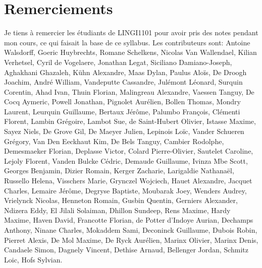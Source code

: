 \section*{Remerciements}

Je tiens à remercier les étudiants de LINGI1101 pour avoir pris des
notes pendant mon cours, ce qui faisait la base de ce syllabus.  Les
contributeurs sont:
Antoine Walsdorff,
Goeric Huybrechts,
Romane Schelkens,
Nicolas Van Wallendael, %
Kilian Verhetsel,
Cyril de Vogelaere,
Jonathan Legat, %
Siciliano Damiano-Joseph,
Aghakhani Ghazaleh,
Kühn Alexandre,
Maas Dylan, %
Paulus Aloïs,
De Droogh Joachim,
André William,
Vandeputte Cassandre, %
Julémont Léonard,
Surquin Corentin,
Ahad Ivan,
Thuin Florian, %
Malingreau Alexandre,
Vaessen Tanguy,
De Cocq Aymeric,
Powell Jonathan, %
Pignolet Aurélien,
Bollen Thomas,
Mondry Laurent,
Leurquin Guillaume, %
Bertaux Jérôme,
Palumbo François,
Clémenti Florent,
Lambin Grégoire, %
Lambot Sue,
de Saint-Hubert Olivier,
Istasse Maxime,
Sayez Niels, %
De Grove Gil,
De Maeyer Julien,
Lepinois Loïc,
Vander Schueren Grégory, %
Van Den Eeckhaut Kim,
De Bels Tanguy,
Cambier Rodolphe, %
Demesmaeker Florian, 
Deplasse Victor,
Colard Pierre-Olivier,
Sautelet Caroline, %
Lejoly Florent, 
Vanden Bulcke Cédric,
Demaude Guillaume,
Ivinza Mbe Scott, %
Georges Benjamin,
Dizier Romain,
Kerger Zacharie,
Larigaldie Nathanaël, %
Russello Helena,
Visschers Marie,
Grynczel Wojciech,
Hauet Alexandre, %
Jacquet Charles,
Lemaire Jérôme,
Degryse Baptiste,
Moubarak Joey,  %
Wenders Audrey,
Vrielynck Nicolas,
Henneton Romain,
Gusbin Quentin,  %
Gerniers Alexander,
Ndizera Eddy,
El Jilali Solaiman,
Dhillon Sundeep, %
Rens Maxime,
Hardy Maxime,
Haven David,
Francotte Florian, %
de Potter d'Indoye Aurian,
Dechamps Anthony,
Ninane Charles,
Mokaddem Sami,  %
Deconinck Guillaume,
Dubois Robin,
Pierret Alexis,
De Mol Maxime, %
De Ryck Aurélien,
Marinx Olivier,
Marinx Denis, %
Candaele Simon, 
Dagnely Vincent,
Dethise Arnaud,
Bellenger Jordan,
Schmitz Loic, %
Hofs Sylvian. %


